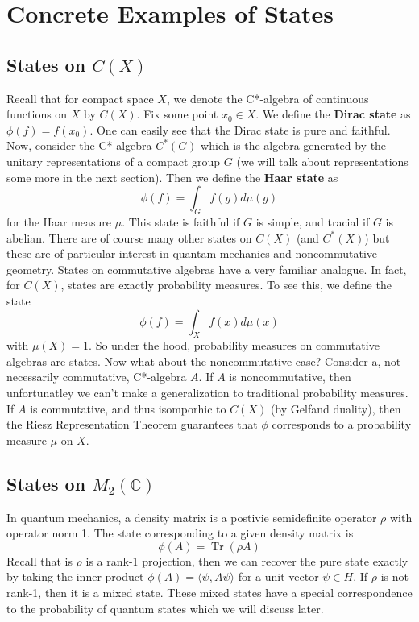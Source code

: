 \section{Concrete Examples of States}
\subsection{States on \( C(X) \)}
Recall that for compact space $X$, we denote the C*-algebra of continuous functions
on $X$ by $C(X)$. Fix some point $x_0 \in X$. We define the \textbf{Dirac state} as
$\phi(f) = f(x_0)$. One can easily see that the Dirac state is pure and faithful.
Now, consider the C*-algebra $C^*(G)$ which is the algebra generated by the unitary representations
of a compact group $G$ (we will talk about representations some more in the next section).
Then we define the \textbf{Haar state} as
\begin{equation}
    \phi(f) = \int_G f(g)d\mu (g)
\end{equation}
for the Haar measure $\mu$. This state is faithful if $G$ is simple, and tracial if
$G$ is abelian. There are of course many other states on $C(X)$ (and $C^*(X)$) but
these are of particular interest in quantam mechanics and noncommutative geometry.
States on commutative algebras have a very familiar analogue. In fact, for $C(X)$,
states are exactly probability measures. To see this, we define the state
\begin{equation}
    \phi(f) = \int_X f(x) d \mu(x)   
\end{equation}
with $\mu(X) = 1$. So under the hood, probability measures on commutative algebras
are states. Now what about the noncommutative case? Consider a, not necessarily commutative,
C*-algebra $A$. If $A$ is noncommutative, then unfortunatley we can't make a generalization
to traditional probability measures. If $A$ is commutative, and thus isomporhic to
$C(X)$ (by Gelfand duality), then the Riesz Representation Theorem guarantees that $\phi$ corresponds
to a probability measure $\mu$ on $X$.


\subsection{States on \( M_2(\mathbb{C}) \)}
In quantum mechanics, a density matrix is a postivie semidefinite operator $\rho$
with operator norm 1. The state corresponding to a given density matrix is
\begin{equation}
    \phi(A) = \operatorname{Tr}(\rho A)
\end{equation}
Recall that is $\rho$ is a rank-1 projection, then we can recover the pure state exactly
by taking the inner-product $\phi(A) = \langle \psi, A\psi \rangle$ for a unit vector
$\psi \in H$. If $\rho$ is not rank-1, then it is a mixed state. These mixed states
have a special correspondence to the probability of quantum states which we will
discuss later.

